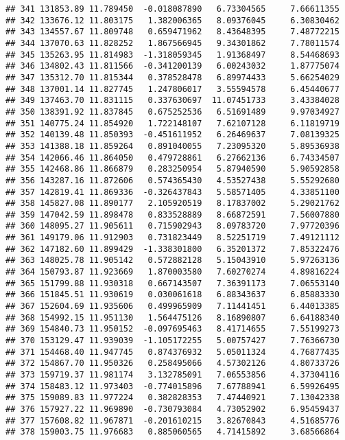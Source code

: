 \documentclass[
]{article}
\begin{document}
\begin{verbatim}
## 341 131853.89 11.789450  -0.018087890   6.73304565     7.66611355
## 342 133676.12 11.803175   1.382006365   8.09376045     6.30830462
## 343 134557.67 11.809748   0.659471962   8.43648395     7.48772215
## 344 137070.63 11.828252   1.867566945   9.34301862     7.78011574
## 345 135263.95 11.814983  -1.318059345   1.91368497     8.54468693
## 346 134802.43 11.811566  -0.341200139   6.00243032     1.87775074
## 347 135312.70 11.815344   0.378528478   6.89974433     5.66254029
## 348 137001.14 11.827745   1.247806017   3.55594578     6.45440677
## 349 137463.70 11.831115   0.337630697  11.07451733     3.43384028
## 350 138391.92 11.837845   0.675252536   6.51691489     9.97034927
## 351 140775.24 11.854920   1.722148107   7.62107128     6.11819719
## 352 140139.48 11.850393  -0.451611952   6.26469637     7.08139325
## 353 141388.18 11.859264   0.891040055   7.23095320     5.89536938
## 354 142066.46 11.864050   0.479728861   6.27662136     6.74334507
## 355 142468.86 11.866879   0.283250954   5.87940590     5.90592858
## 356 143287.16 11.872606   0.574365430   4.53527438     5.55292680
## 357 142819.41 11.869336  -0.326437843   5.58571405     4.33851100
## 358 145827.08 11.890177   2.105920519   8.17837002     5.29021762
## 359 147042.59 11.898478   0.833528889   8.66872591     7.56007880
## 360 148095.27 11.905611   0.715902943   8.09783720     7.97720396
## 361 149179.06 11.912903   0.731823449   8.52251719     7.49121112
## 362 147182.60 11.899429  -1.338301800   6.35201372     7.85322476
## 363 148025.78 11.905142   0.572882128   5.15043910     5.97263136
## 364 150793.87 11.923669   1.870003580   7.60270274     4.89816224
## 365 151799.88 11.930318   0.667143507   7.36391173     7.06553140
## 366 151845.51 11.930619   0.030061618   6.88343637     6.85883330
## 367 152604.69 11.935606   0.499965909   7.11441451     6.44013385
## 368 154992.15 11.951130   1.564475126   8.16890807     6.64188340
## 369 154840.73 11.950152  -0.097695463   8.41714655     7.55199273
## 370 153129.47 11.939039  -1.105172255   5.00757427     7.76366730
## 371 154468.40 11.947745   0.874376932   5.05011324     4.76877435
## 372 154867.70 11.950326   0.258495066   4.57302126     4.80733726
## 373 159719.37 11.981174   3.132785091   7.06553856     4.37304116
## 374 158483.12 11.973403  -0.774015896   7.67788941     6.59926495
## 375 159089.83 11.977224   0.382828353   7.47440921     7.13042338
## 376 157927.22 11.969890  -0.730793084   4.73052902     6.95459437
## 377 157608.82 11.967871  -0.201610215   3.82670843     4.51685776
## 378 159003.75 11.976683   0.885060565   4.71415892     3.68566864

\end{verbatim}
\end{document}

